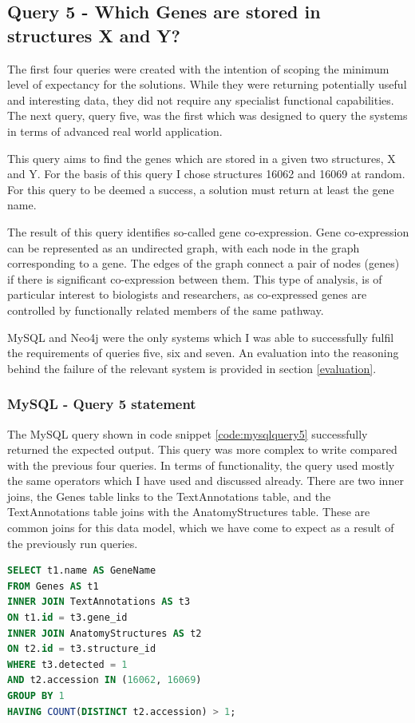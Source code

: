 \subsection*{Query 5 - Which Genes are stored in structures X and Y?}\label{query5}
The first four queries were created with the intention of scoping the minimum level of expectancy for the solutions. While they were returning potentially useful and interesting data, they did not require any specialist functional capabilities. The next query, query five, was the first which was designed to query the systems in terms of advanced real world application.

This query aims to find the genes which are stored in a given two structures, X and Y. For the basis of this query I chose structures 16062 and 16069 at random. For this query to be deemed a success, a solution must return at least the gene name.

The result of this query identifies so-called gene co-expression. Gene co-expression can be represented as an undirected graph, with each node in the graph corresponding to a gene. The edges of the graph connect a pair of nodes (genes) if there is significant co-expression between them. This type of analysis, is of particular interest to biologists and researchers, as co-expressed genes are controlled by functionally related members of the same pathway.

MySQL and Neo4j were the only systems which I was able to successfully fulfil the requirements of queries five, six and seven. An evaluation into the reasoning behind the failure of the relevant system is provided in section \ref{evaluation}.

\subsubsection*{MySQL - Query 5 statement}\label{mysqlquery5statement}
The MySQL query shown in code snippet \ref{code:mysqlquery5} successfully returned the expected output. This query was more complex to write compared with the previous four queries. In terms of functionality, the query used mostly the same operators which I have used and discussed already. There are two inner joins, the Genes table links to the TextAnnotations table, and the TextAnnotations table joins with the AnatomyStructures table. These are common joins for this data model, which we have come to expect as a result of the previously run queries.

\begin{lstlisting}[language=SQL, caption=MySQL query 5 statement. Which Genes are stored in structures X and Y?., label=code:mysqlquery5]
SELECT t1.name AS GeneName
FROM Genes AS t1
INNER JOIN TextAnnotations AS t3
ON t1.id = t3.gene_id
INNER JOIN AnatomyStructures AS t2
ON t2.id = t3.structure_id
WHERE t3.detected = 1
AND t2.accession IN (16062, 16069)
GROUP BY 1
HAVING COUNT(DISTINCT t2.accession) > 1;
\end{lstlisting}

